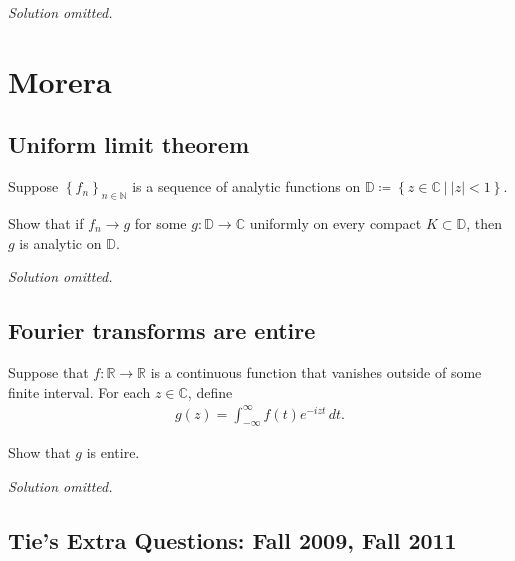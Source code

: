 \emph{Solution omitted.}

\hypertarget{morera}{%
\section{Morera}\label{morera}}

\hypertarget{uniform-limit-theorem}{%
\subsection{Uniform limit theorem}\label{uniform-limit-theorem}}

\begin{problem}[?]

Suppose \(\left\{{f_n}\right\}_{n\in {\mathbb{N}}}\) is a sequence of
analytic functions on
\({\mathbb{D}}\coloneqq\left\{{z\in {\mathbb{C}}{~\mathrel{\Big\vert}~}{\left\lvert {z} \right\rvert} < 1}\right\}\).

Show that if \(f_n\to g\) for some \(g: {\mathbb{D}}\to {\mathbb{C}}\)
uniformly on every compact \(K\subset {\mathbb{D}}\), then \(g\) is
analytic on \({\mathbb{D}}\).

\end{problem}

\emph{Solution omitted.}

\hypertarget{fourier-transforms-are-entire}{%
\subsection{Fourier transforms are
entire}\label{fourier-transforms-are-entire}}

\begin{problem}[?]

Suppose that \(f: {\mathbb{R}}\to{\mathbb{R}}\) is a continuous function
that vanishes outside of some finite interval. For each
\(z\in {\mathbb{C}}\), define
\begin{align*}
g(z) = \int_{-\infty}^\infty f(t) e^{-izt} \,dt
.\end{align*}

Show that \(g\) is entire.

\end{problem}

\emph{Solution omitted.}

\hypertarget{ties-extra-questions-fall-2009-fall-2011}{%
\subsection{Tie's Extra Questions: Fall 2009, Fall
2011}\label{ties-extra-questions-fall-2009-fall-2011}}

